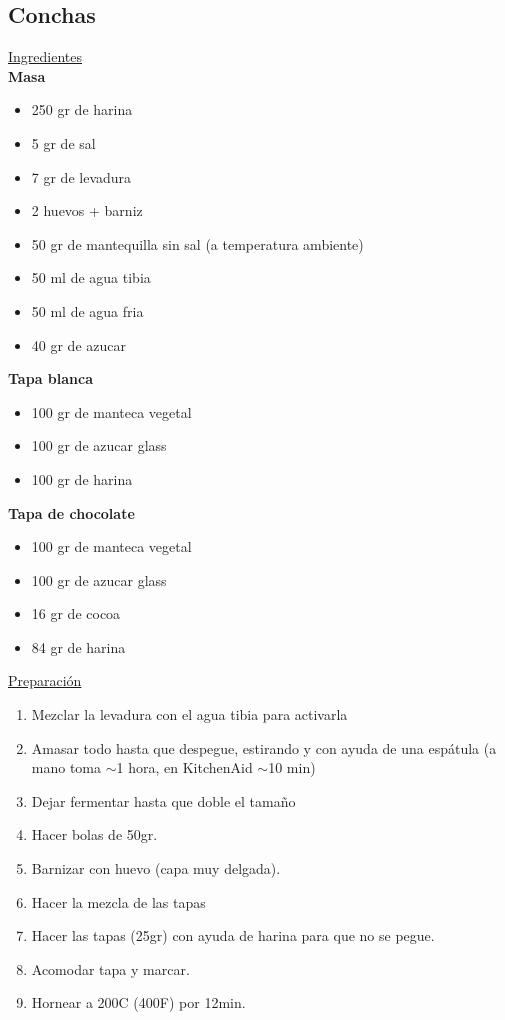 \subsection{Conchas}

\underline{Ingredientes}\\
\textbf{Masa}
\begin{itemize}
\item 250 gr de harina
\item 5 gr de sal
\item 7 gr de levadura
\item 2 huevos +  barniz
\item 50 gr de mantequilla sin sal (a temperatura ambiente)
\item 50 ml de agua tibia
\item 50 ml de agua fria
\item 40 gr de azucar
\end{itemize}


\textbf{Tapa blanca}
\begin{itemize}
\item 100 gr de manteca vegetal
\item 100 gr de azucar glass
\item 100 gr de harina
\end{itemize}

\textbf{Tapa de chocolate}
\begin{itemize}
\item 100 gr de manteca vegetal
\item 100 gr de azucar glass
\item 16 gr de cocoa
\item 84 gr de harina
\end{itemize}

\underline{Preparaci\'on}

\begin{enumerate}
\item Mezclar la levadura con el agua tibia para activarla
\item Amasar todo hasta que despegue, estirando y con ayuda de una espátula (a mano toma $\sim$1 hora, en KitchenAid $\sim$10 min)
\item Dejar fermentar hasta que doble el tamaño
\item Hacer bolas de 50gr.
\item Barnizar con huevo (capa muy delgada).
\item Hacer la mezcla de las tapas
\item Hacer las tapas (25gr) con ayuda de harina para que no se pegue. 
\item Acomodar tapa y marcar.
\item Hornear a 200C (400F) por 12min.
\end{enumerate}
